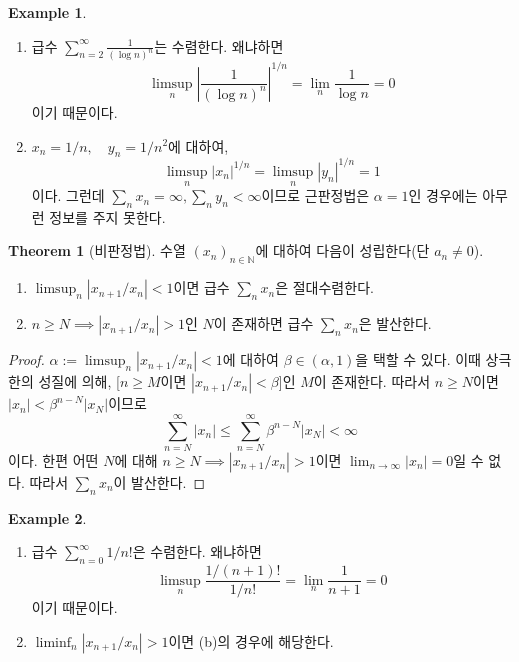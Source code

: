 \documentclass[11pt]{book}
\numberwithin{equation}{chapter}
\def\NN{\mathbb{N}}
\newcommand{\abs}[1]{\left\vert#1\right\vert}
\theoremstyle{definition}
\newtheorem{thm}{Theorem}[section]
\newtheorem*{ex}{Example}
\newenvironment{enum}
	{\begin{enumerate}[label=(\alph*), leftmargin=2\parindent]}
	{\end{enumerate}}
\begin{document}
\begin{ex}
    \quad

    \begin{enum}
        \item 급수 \(\sum_{n=2}^\infty \frac{1}{(\log n)^n}\)는 수렴한다. 왜냐하면
        \[
        \limsup_n \abs{\frac{1}{(\log n)^n}}^{1/n} = \lim_n \frac{1}{\log n} = 0
        \]
        이기 때문이다.
        \item \(x_n = 1/n, \quad y_n = 1/n^2\)에 대하여,
        \[
        \limsup_n \abs{x_n}^{1/n} = \limsup_n \abs{y_n}^{1/n} = 1
        \]
        이다. 그런데 \(\sum_n x_n = \infty, \sum_n y_n < \infty\)이므로 근판정법은 \(\alpha = 1\)인 경우에는 아무런 정보를 주지 못한다.
    \end{enum}
\end{ex}

\begin{thm}[비판정법]
    수열 \((x_n)_{n \in \NN}\)에 대하여 다음이 성립한다(단 \(a_n \ne 0\)).
    \begin{enum}
        \item \(\limsup_n \abs{x_{n+1} / x_n} < 1\)이면 급수 \(\sum_n x_n\)은 절대수렴한다.
        \item \(n \ge N \implies \abs{x_{n+1} / x_n} > 1\)인 \(N\)이 존재하면 급수 \(\sum_n x_n\)은 발산한다.
    \end{enum}
\end{thm}
\begin{proof}
    \(\alpha := \limsup_n \abs{x_{n+1} / x_n} < 1\)에 대하여 \(\beta \in (\alpha, 1)\)을 택할 수 있다. 이때 상극한의 성질에 의해, [\(n \ge M\)이면 \(\abs{x_{n+1} / x_n} < \beta\)]인 \(M\)이 존재한다. 따라서 \(n \ge N\)이면 \(\abs{x_n} < \beta^{n-N}\abs{x_N}\)이므로
    \[
    \sum_{n=N}^\infty \abs{x_n} \le \sum_{n=N}^\infty \beta^{n-N}\abs{x_N} < \infty
    \]
    이다. 한편 어떤 \(N\)에 대해 \(n \ge N \implies \abs{x_{n+1} / x_n} > 1\)이면 \(\lim_{n \to \infty} \abs{x_n} = 0\)일 수 없다. 따라서 \(\sum_n x_n\)이 발산한다.
\end{proof}

\begin{ex}
    \quad

    \begin{enum}
        \item 급수 \(\sum_{n=0}^\infty 1/n!\)은 수렴한다. 왜냐하면
        \[
        \limsup_n \frac{1/(n+1)!}{1/n!} = \lim_n \frac{1}{n+1} = 0    
        \]
        이기 때문이다.
        \item \(\liminf_n \abs{x_{n+1} / x_n} > 1\)이면 (b)의 경우에 해당한다.
    \end{enum}
\end{ex}
\end{document}
